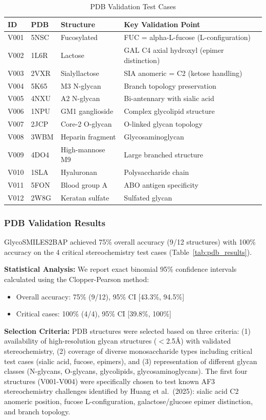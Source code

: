 \documentclass[11pt,a4paper]{article}
\begin{document}
\begin{table}[h]
\centering
\caption{PDB Validation Test Cases}
\begin{tabular}{lllp{5cm}}
\toprule
ID & PDB & Structure & Key Validation Point \\
\midrule
V001 & 5NSC & Fucosylated & FUC = alpha-L-fucose (L-configuration) \\
V002 & 1L6R & Lactose & GAL C4 axial hydroxyl (epimer distinction) \\
V003 & 2VXR & Sialyllactose & SIA anomeric = C2 (ketose handling) \\
V004 & 5K65 & M3 N-glycan & Branch topology preservation \\
V005 & 4NXU & A2 N-glycan & Bi-antennary with sialic acid \\
V006 & 1NPU & GM1 ganglioside & Complex glycolipid structure \\
V007 & 2JCP & Core-2 O-glycan & O-linked glycan topology \\
V008 & 3WBM & Heparin fragment & Glycosaminoglycan \\
V009 & 4DO4 & High-mannose M9 & Large branched structure \\
V010 & 1SLA & Hyaluronan & Polysaccharide chain \\
V011 & 5FON & Blood group A & ABO antigen specificity \\
V012 & 2W8G & Keratan sulfate & Sulfated glycan \\
\bottomrule
\end{tabular}
\label{tab:pdb_cases}
\end{table}

\subsubsection{PDB Validation Results}

GlycoSMILES2BAP achieved 75\% overall accuracy (9/12 structures) with 100\% accuracy on the 4 critical stereochemistry test cases (Table~\ref{tab:pdb_results}). 

\noindent\textbf{Statistical Analysis:} We report exact binomial 95\% confidence intervals calculated using the Clopper-Pearson method:
\begin{itemize}
\item Overall accuracy: 75\% (9/12), 95\% CI [43.3\%, 94.5\%]
\item Critical cases: 100\% (4/4), 95\% CI [39.8\%, 100\%]
\end{itemize}

\noindent\textbf{Selection Criteria:} PDB structures were selected based on three criteria: (1) availability of high-resolution glycan structures ($<$2.5\AA) with validated stereochemistry, (2) coverage of diverse monosaccharide types including critical test cases (sialic acid, fucose, epimers), and (3) representation of different glycan classes (N-glycans, O-glycans, glycolipids, glycosaminoglycans). The first four structures (V001-V004) were specifically chosen to test known AF3 stereochemistry challenges identified by Huang et al.~(2025): sialic acid C2 anomeric position, fucose L-configuration, galactose/glucose epimer distinction, and branch topology.
\end{document}

